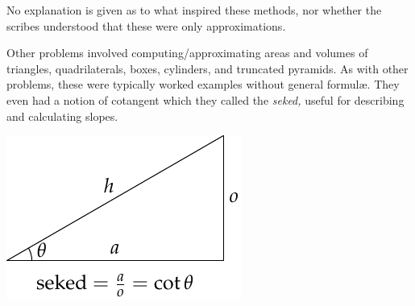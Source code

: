 No explanation is given as to what inspired these methods, nor whether the scribes understood that these were only approximations.\smallbreak
\begin{minipage}[t]{0.67\linewidth}\vspace{0pt}
	Other problems involved computing/approximating areas and volumes of triangles, quadrilaterals, boxes, cylinders, and truncated pyramids. As with other problems, these were typically worked examples without general formulæ. They even had a notion of cotangent which they called the \emph{seked,} useful for describing and calculating slopes.
\end{minipage}
\hfill
\begin{minipage}[t]{0.32\linewidth}\vspace{0pt}
	\flushright\includegraphics{geo-01-seked}
\end{minipage}


\goodbreak


